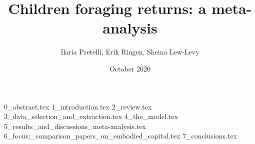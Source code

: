 \documentclass{article}
\title{Children foraging returns: a meta-analysis}
\author{Ilaria Pretelli, Erik Ringen, Sheina Lew-Levy}
\date{October 2020}
\begin{document}
\maketitle
\linenumbers


{0_abstract.tex}
{1_introduction.tex}
{2_review.tex}
{3_data_selection_and_extraction.tex}
{4_the_model.tex}
{5_results_and_discussions_meta-analysis.tex}
{6_focus:_comparison_papers_on_embodied_capital.tex}
{7_conclusions.tex}




\end{document}

